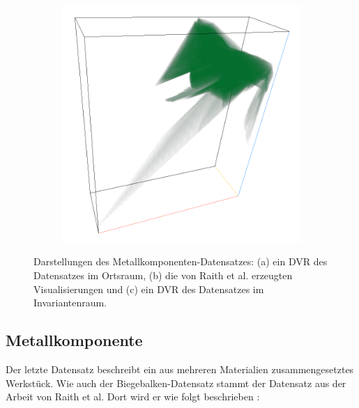 \documentclass[a4paper,fontsize=12pt,toc=bib,parskip=half,ngerman]{scrartcl}
\begin{document}
\begin{figure}
\begin{subfigure}{0.45\textwidth}
		\subcaption{}
		\label{NodelRaith}
	\end{subfigure}	
	\hspace*{\fill}
	\begin{subfigure}{0.3\textwidth}
		\centering
		\includegraphics[width=\textwidth]{pictures/results/Nodel/Nodel_InvariantSpace.png}
		\subcaption{}
		\label{NodelInvariant}
	\end{subfigure}
	\caption{Darstellungen des Metallkomponenten-Datensatzes: (a) ein DVR des Datensatzes im Ortsraum, (b) die von Raith et al. erzeugten Visualisierungen und (c) ein DVR des Datensatzes im Invariantenraum.}
	\label{Nodel}
\end{figure}

\subsection{Metallkomponente}
Der letzte Datensatz beschreibt ein aus mehreren Materialien zusammengesetztes Werkst\"uck. Wie auch der Biegebalken-Datensatz stammt der Datensatz aus der Arbeit von Raith et al. Dort wird er wie folgt beschrieben \cite[S.~1129]{raith2019tensor}:
\end{document}
